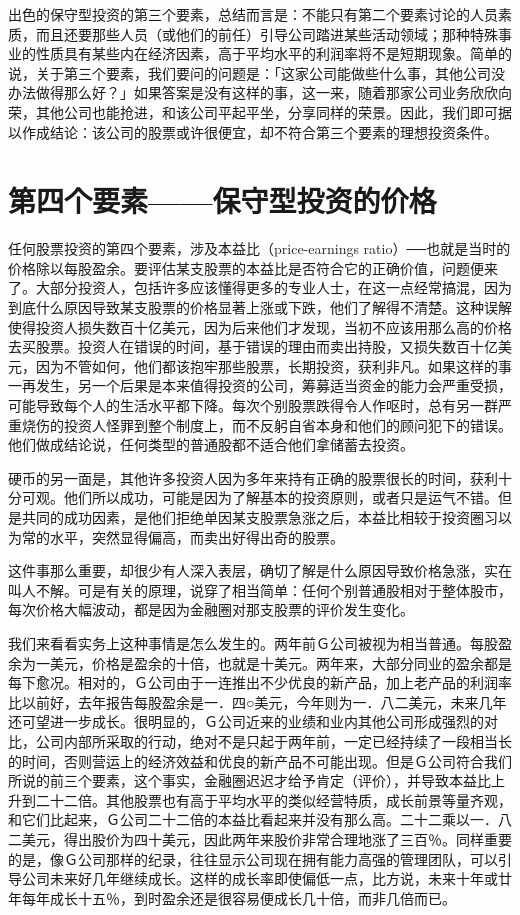 \documentclass[UTF8,a4paper,zihao=-4,fontset = windows]{ctexart} %
\begin{document}
出色的保守型投资的第三个要素，总结而言是：不能只有第二个要素讨论的人员素质，而且还要那些人员（或他们的前任）引导公司踏进某些活动领域；那种特殊事业的性质具有某些内在经济因素，高于平均水平的利润率将不是短期现象。简单的说，关于第三个要素，我们要问的问题是：「这家公司能做些什么事，其他公司没办法做得那么好？」如果答案是没有这样的事，这一来，随着那家公司业务欣欣向荣，其他公司也能抢进，和该公司平起平坐，分享同样的荣景。因此，我们即可据以作成结论：该公司的股票或许很便宜，却不符合第三个要素的理想投资条件。

\section{第四个要素——保守型投资的价格}

任何股票投资的第四个要素，涉及本益比（price-earnings ratio）──也就是当时的价格除以每股盈余。要评估某支股票的本益比是否符合它的正确价值，问题便来了。大部分投资人，包括许多应该懂得更多的专业人士，在这一点经常搞混，因为到底什么原因导致某支股票的价格显著上涨或下跌，他们了解得不清楚。这种误解使得投资人损失数百十亿美元，因为后来他们才发现，当初不应该用那么高的价格去买股票。投资人在错误的时间，基于错误的理由而卖出持股，又损失数百十亿美元，因为不管如何，他们都该抱牢那些股票，长期投资，获利非凡。如果这样的事一再发生，另一个后果是本来值得投资的公司，筹募适当资金的能力会严重受损，可能导致每个人的生活水平都下降。每次个别股票跌得令人作呕时，总有另一群严重烧伤的投资人怪罪到整个制度上，而不反躬自省本身和他们的顾问犯下的错误。他们做成结论说，任何类型的普通股都不适合他们拿储蓄去投资。

硬币的另一面是，其他许多投资人因为多年来持有正确的股票很长的时间，获利十分可观。他们所以成功，可能是因为了解基本的投资原则，或者只是运气不错。但是共同的成功因素，是他们拒绝单因某支股票急涨之后，本益比相较于投资圈习以为常的水平，突然显得偏高，而卖出好得出奇的股票。

这件事那么重要，却很少有人深入表层，确切了解是什么原因导致价格急涨，实在叫人不解。可是有关的原理，说穿了相当简单：任何个别普通股相对于整体股市，每次价格大幅波动，都是因为金融圈对那支股票的评价发生变化。

我们来看看实务上这种事情是怎么发生的。两年前Ｇ公司被视为相当普通。每股盈余为一美元，价格是盈余的十倍，也就是十美元。两年来，大部分同业的盈余都是每下愈况。相对的，Ｇ公司由于一连推出不少优良的新产品，加上老产品的利润率比以前好，去年报告每股盈余是一．四○美元，今年则为一．八二美元，未来几年还可望进一步成长。很明显的，Ｇ公司近来的业绩和业内其他公司形成强烈的对比，公司内部所采取的行动，绝对不是只起于两年前，一定已经持续了一段相当长的时间，否则营运上的经济效益和优良的新产品不可能出现。但是Ｇ公司符合我们所说的前三个要素，这个事实，金融圈迟迟才给予肯定（评价），并导致本益比上升到二十二倍。其他股票也有高于平均水平的类似经营特质，成长前景等量齐观，和它们比起来，Ｇ公司二十二倍的本益比看起来并没有那么高。二十二乘以一．八二美元，得出股价为四十美元，因此两年来股价非常合理地涨了三百％。同样重要的是，像Ｇ公司那样的纪录，往往显示公司现在拥有能力高强的管理团队，可以引导公司未来好几年继续成长。这样的成长率即使偏低一点，比方说，未来十年或廿年每年成长十五％，到时盈余还是很容易便成长几十倍，而非几倍而已。
\end{document}
